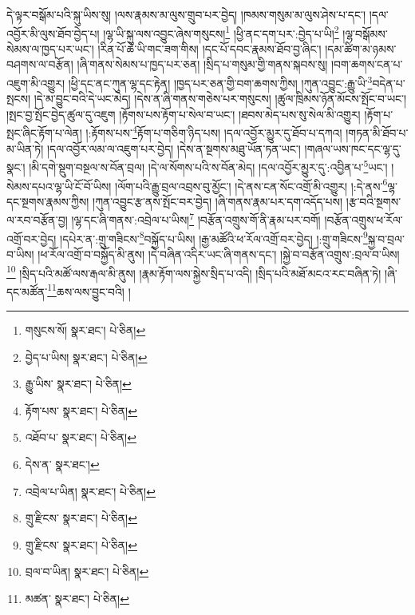 དེ་ལྟར་བསྒོམ་པའི་སྐུ་ཡིས་སུ། །ལས་རྣམས་མ་ལུས་གྲུབ་པར་བྱེད། །ཁམས་གསུམ་མ་ལུས་ཤེས་པ་དང་། །དལ་འབྱོར་མི་ལུས་ཐོབ་བྱེད་པ། །ལྷ་ཡི་སྐུ་ལས་འབྱུང་ཞེས་གསུངས།\footnote{གསུངས་སོ།  སྣར་ཐང་།  པེ་ཅིན། } །ཕྱི་ནང་དག་པར་:བྱེད་པ་ཡི།\footnote{བྱེད་པ་ཡིས།  སྣར་ཐང་།  པེ་ཅིན། } །ལྷ་བསྒོམས་སེམས་ལ་ཁྱད་པར་ཡང་། །རིན་པོ་ཆེ་ཡི་གང་ཟག་གིས། །དང་པོ་དབང་རྣམས་ཐོབ་བྱ་ཞིང་། །དམ་ཚིག་མ་ཉམས་བཤགས་ལ་བརྩོན། །ཞི་གནས་སེམས་པ་ཁྱད་པར་ཅན། །སྲིད་པ་གསུམ་གྱི་གནས་སྐབས་སུ། །བག་ཆགས་ངན་པ་འཇུག་མི་འགྱུར། །ཕྱི་དང་ནང་ཀུན་ལྷ་དང་རྟེན། །ཁྱད་པར་ཅན་གྱི་བག་ཆགས་ཀྱིས། །ཀུན་འབྱུང་:རྒྱུ་ཡི་\footnote{རྒྱུ་ཡིས་  སྣར་ཐང་།  པེ་ཅིན། }བདེན་པ་སྤངས། །དེ་མ་བྱུང་བའི་དེ་ཡང་མེད། །དེས་ན་ཞི་གནས་གཅེས་པར་གསུངས། །ཚུལ་ཁྲིམས་ཉོན་མོངས་སྤོང་བ་ཡང་། །སྤང་བྱ་སྤོང་བྱེད་ཚུལ་དུ་འཇུག །རྟོགས་པས་རྟོག་པ་སེལ་བ་ཡང་། །ཐབས་མེད་པས་སུ་སེལ་མི་འགྱུར། །རྟོག་པ་སྤང་ཞིང་རྟོག་པ་ལེན། །:རྟོགས་པས་\footnote{རྟོག་པས་  སྣར་ཐང་།  པེ་ཅིན། }རྟོག་པ་གཅིག་ཉིད་པས། །དལ་འབྱོར་མྱུར་དུ་ཐོབ་པ་དཀའ། །གཏན་མི་ཐོབ་པ་མ་ཡིན་ཏེ། །དལ་འབྱོར་ལམ་ལ་འཇུག་པར་བྱེད། །དེས་ན་སྔགས་མཐུ་ཡོན་ཏན་ཡང་། །གཞལ་ཡས་ཁང་དང་ལྷ་དུ་སྣང་། །མི་དགེ་སྡུག་བསྔལ་ས་བོན་བྲལ། །དེ་ལ་སོགས་པའི་ས་བོན་མེད། །དལ་འབྱོར་མྱུར་དུ་:འབྱིན་པ་\footnote{འཐོབ་པ་  སྣར་ཐང་།  པེ་ཅིན། }ཡང་། །སེམས་དཔའ་ལྷ་ཡི་ངོ་བོ་ཡིས། །ལོག་པའི་རྒྱུ་བྲལ་འབྲས་བུ་མྱོང་། །དེ་ནས་ངན་སོང་འགྲོ་མི་འགྱུར། །:དེ་ནས་\footnote{དེས་ན་  སྣར་ཐང་། }ལྷ་དང་སྔགས་རྣམས་ཀྱིས། །ཀུན་འབྱུང་རྩ་ནས་སྤོང་བར་བྱེད། །ཞི་གནས་རྣམ་པར་དག་འདོད་པས། །རྩ་བའི་སྔགས་ལ་རབ་བརྩོན་བྱ། །ལྷ་དང་ཞི་གནས་:འབྲེལ་པ་ཡིས།\footnote{འབྲེལ་པ་ཡིན།  སྣར་ཐང་།  པེ་ཅིན། } །བརྩོན་འགྲུས་གོ་ནི་རྣམ་པར་བགོ། །བརྩོན་འགྲུས་ཕ་རོལ་འགྲོ་བར་བྱེད། །དཔེར་ན་:གྲུ་གཟིངས་\footnote{གྲུ་རྫིངས་  སྣར་ཐང་།  པེ་ཅིན། }བསྐྱོད་པ་ཡིས། །རྒྱ་མཚོའི་ཕ་རོལ་འགྲོ་བར་བྱེད། །:གྲུ་གཟིངས་\footnote{གྲུ་རྫིངས་  སྣར་ཐང་།  པེ་ཅིན། }སྐྱ་བ་བྲལ་བ་ཡིས། །ཕ་རོལ་འགྲོ་བ་བསྐྱོད་མི་ནུས། །དེ་བཞིན་འདིར་ཡང་ཞི་གནས་དང་། །སྐྱེ་བ་བརྩོན་འགྲུས་:བྲལ་བ་ཡིས།\footnote{བྲལ་བ་ཡིན།  སྣར་ཐང་།  པེ་ཅིན། } །སྲིད་པའི་མཚོ་ལས་རྒལ་མི་ནུས། །རྣམ་རྟོག་ལས་སྐྱེས་སྲིད་པ་འདི། །སྲིད་པའི་མཐོ་མངའ་རང་བཞིན་ཏེ། །ཞི་དང་མཚོན་\footnote{མཚན་  སྣར་ཐང་།  པེ་ཅིན། }ཆས་ལས་བྱུང་བའི། །
